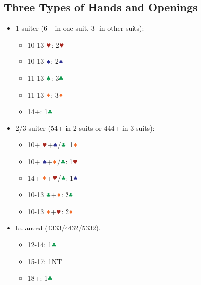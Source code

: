\documentclass{article}
\begin{document}
\begin{multicols}{2}
\section{Three Types of Hands and Openings}
\begin{itemize}
    \item 1-suiter (6+ in one suit, 3- in other suits):
    \begin{itemize}
        \item 10-13 $\hhh$: 2$\hhh$
        \item 10-13 $\sss$: 2$\sss$
        \item 11-13 $\ccc$: 3$\ccc$
        \item 11-13 $\ddd$: 3$\ddd$
        \item 14+: 1$\ccc$
    \end{itemize}
    \item 2/3-suiter (54+ in 2 suits or 444+ in 3 suits):
    \begin{itemize}
        \item 10+ $\hhh$+$\sss$/$\ccc$: 1$\ddd$
        \item 10+ $\sss$+$\ddd$/$\ccc$: 1$\hhh$
        \item 14+ $\ddd$+$\hhh$/$\ccc$: 1$\sss$
        \item 10-13 $\ccc$+$\ddd$: 2$\ccc$
        \item 10-13 $\ddd$+$\hhh$: 2$\ddd$
    \end{itemize}
    \item balanced (4333/4432/5332):
    \begin{itemize}
        \item 12-14: 1$\ccc$
        \item 15-17: 1NT
        \item 18+: 1$\ccc$
    \end{itemize}
\end{itemize}


\end{multicols}
\end{document}
